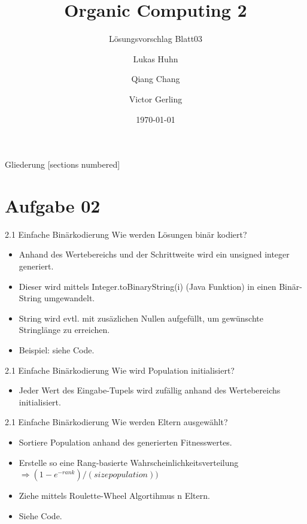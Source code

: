 \documentclass{ocbeameruni}
\title{Organic Computing 2}
\subtitle{Lösungsvorschlag Blatt03}
\date{\today}
\author{Lukas Huhn \and Qiang Chang \and Victor Gerling}
\institute{%
  Universität Augsburg\\
  Institut für Informatik\\
  Lehrstuhl für Organic Computing
}
\begin{document}
\maketitle


\begin{frame}{Gliederung}
  [sections numbered]
  \tableofcontents
\end{frame}


\section{Aufgabe 02}

\begin{frame}{2.1 Einfache Binärkodierung}
Wie werden Lösungen binär kodiert? 
    \begin{itemize}
    \item Anhand des Wertebereichs und der Schrittweite wird ein unsigned integer generiert.
    \item Dieser wird mittels Integer.toBinaryString(i) (Java Funktion) in einen Binär-String umgewandelt.
    \item String wird evtl. mit zusäzlichen Nullen aufgefüllt, um gewünschte Stringlänge zu erreichen.
    \item Beispiel: siehe Code.
    \end{itemize}
\end{frame}

\begin{frame}{2.1 Einfache Binärkodierung}
Wie wird Population initialisiert? 
    \begin{itemize}
    \item Jeder Wert des Eingabe-Tupels wird zufällig anhand des Wertebereichs initialisiert.
    \end{itemize}
\end{frame}

\begin{frame}{2.1 Einfache Binärkodierung}
Wie werden Eltern ausgewählt? 
    \begin{itemize}
    \item Sortiere Population anhand des generierten Fitnesswertes.
    \item Erstelle so eine Rang-basierte Wahrscheinlichkeitsverteilung $\Rightarrow (1 - e^{- rank}) / (size population))$
    \item Ziehe mittels Roulette-Wheel Algortihmus n Eltern.
    \item Siehe Code.
    \end{itemize}
\end{frame}
\end{document}
